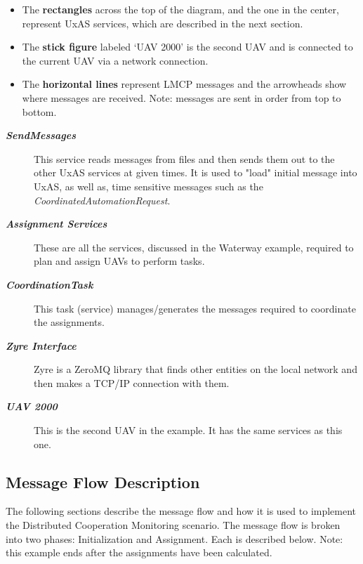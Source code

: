\begin{itemize}
	\item The \textbf{rectangles} across the top of the diagram, and the one in the center, represent UxAS services, which are described in the next section. 
	\item The \textbf{stick figure} labeled `UAV 2000' is the second UAV and is connected to the current UAV via a network connection. 
	\item The \textbf{horizontal lines} represent LMCP messages and the arrowheads show where messages are received. Note: messages are sent in order from top to bottom.
\end{itemize}

\begin{description}
	\item[\textit{\textbf{SendMessages}}] This service reads messages from files and then sends them out to the other UxAS services at given times. It is used to "load" initial message into UxAS, as well as, time sensitive messages such as the \textit{CoordinatedAutomationRequest}.
	\item[\textit{\textbf{Assignment Services}}] These are all the services, discussed in the Waterway example, required to plan and assign UAVs to perform tasks. 
	\item[\textit{\textbf{CoordinationTask}}] This task (service) manages/generates the messages required to coordinate the assignments. 
	\item[\textit{\textbf{Zyre Interface}}] Zyre is a ZeroMQ library that finds other entities on the local network and then makes a TCP/IP connection with them. 
	\item[\textit{\textbf{UAV 2000}}] This is the second UAV in the example. It has the same services as this one. 
\end{description}

\subsection{Message Flow Description}
The following sections describe the message flow and how it is used to implement the Distributed Cooperation Monitoring scenario. The message flow is broken into two phases: Initialization and Assignment. Each is described below. Note: this example ends after the assignments have been calculated.


